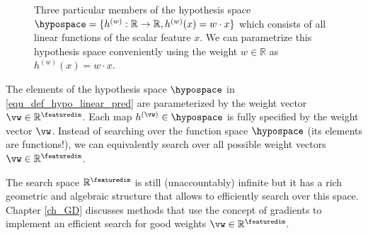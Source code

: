 \documentclass[12pt]{report}
\newcommand{\featurelen}{\featuredim}
\begin{document}
\begin{figure}[htbp]
\begin{center}
     \vspace*{-4mm}
\end{center}
\caption{Three particular members of the hypothesis space 
	$\hypospace =\{ h^{(w)}: \mathbb{R} \rightarrow \mathbb{R}, h^{(w)}(x) = w \cdot x \}$ 
which consists of all linear functions of the scalar feature $x$. We can parametrize 
this hypothesis space conveniently using the weight $w\in \mathbb{R}$ as $h^{(w)}(x) = w \cdot x$.}
\label{scalar_lin_space}
\end{figure}

The elements of the hypothesis space $\hypospace$ in \eqref{equ_def_hypo_linear_pred} are  
parameterized by the weight vector $\vw \in \mathbb{R}^{\featuredim}$. 
Each map $h^{(\vw)} \in \hypospace$ is fully specified by the weight 
vector $\vw$. Instead of searching over the function space $\hypospace$ 
(its elements are functions!), we can equivalently search over all 
possible weight vectors $\vw \in \mathbb{R}^{\featuredim}$. 

The search space $\mathbb{R}^{\featuredim}$ is still (unaccountably) 
infinite but it has a rich geometric and algebraic structure that 
allows to efficiently search over this space. Chapter \ref{ch_GD} 
discusses methods that use the concept of gradients to implement  
an efficient search for good weights $\vw \in \mathbb{R}^{\featurelen}$. 
\end{document}
